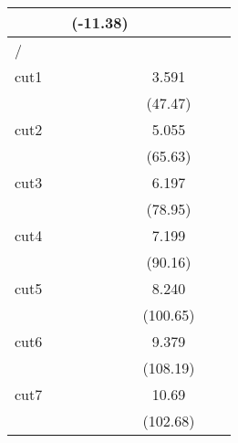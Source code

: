 {\begin{tabular}{l*{5}{c}}
            &                     &    (-11.38)         &                     &                     &                     \\
\hline
/           &                     &                     &                     &                     &                     \\
cut1        &                     &                     &       3.591\sym{***}&                     &                     \\
            &                     &                     &     (47.47)         &                     &                     \\
[1em]
cut2        &                     &                     &       5.055\sym{***}&                     &                     \\
            &                     &                     &     (65.63)         &                     &                     \\
[1em]
cut3        &                     &                     &       6.197\sym{***}&                     &                     \\
            &                     &                     &     (78.95)         &                     &                     \\
[1em]
cut4        &                     &                     &       7.199\sym{***}&                     &                     \\
            &                     &                     &     (90.16)         &                     &                     \\
[1em]
cut5        &                     &                     &       8.240\sym{***}&                     &                     \\
            &                     &                     &    (100.65)         &                     &                     \\
[1em]
cut6        &                     &                     &       9.379\sym{***}&                     &                     \\
            &                     &                     &    (108.19)         &                     &                     \\
[1em]
cut7        &                     &                     &       10.69\sym{***}&                     &                     \\
            &                     &                     &    (102.68)         &                     &                     \\

\end{tabular}}
